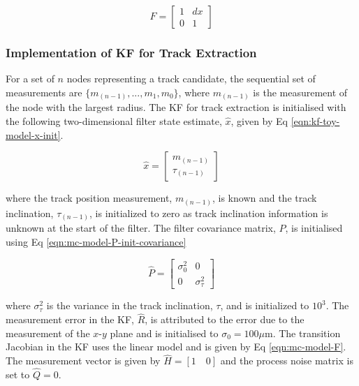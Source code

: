\begin{equation}
\hat{F} = \begin{bmatrix} 1 & dx \\ 0 & 1 \end{bmatrix}
\label{eqn:mc-model-F}
\end{equation}



\subsubsection{Implementation of KF for Track Extraction}

For a set of $n$ nodes representing a track candidate, the sequential set of measurements are $\{m_{(n-1)}, ..., m_1, m_0 \}$, where $m_{(n-1)}$ is the measurement of the node with the largest radius. The KF for track extraction is initialised with the following two-dimensional filter state estimate, $\hat{x}$, given by Eq \eqref{eqn:kf-toy-model-x-init}.

\begin{equation}
\hat{x} = \begin{bmatrix} m_{(n-1)} \\ \tau_{(n-1)} \end{bmatrix}
\label{eqn:kf-toy-model-x-init}
\end{equation}

where the track position measurement, $m_{(n-1)}$, is known and the track inclination, $\tau_{(n-1)}$, is initialized to zero as track inclination information is unknown at the start of the filter. The filter covariance matrix, $\hat{P}$, is initialised using Eq \eqref{eqn:mc-model-P-init-covariance}

\begin{equation}
\hat{P} = \begin{bmatrix} \sigma_0^{2} & 0 \\ 0 & \sigma_{\tau}^2 \end{bmatrix}
\label{eqn:mc-model-P-init-covariance}
\end{equation}

where $\sigma_{\tau}^2$ is the variance in the track inclination, $\tau$, and is initialized to $10^3$. The measurement error in the KF, $\hat{R}$, is attributed to the error due to the measurement of the $x$-$y$ plane and is initialised to $\sigma_{0} = 100\mu$m. The transition Jacobian in the KF uses the linear model and is given by Eq \eqref{eqn:mc-model-F}. The measurement vector is given by $\hat{H} = [1 \quad 0]$ and the process noise matrix is set to $\hat{Q} = 0$.



